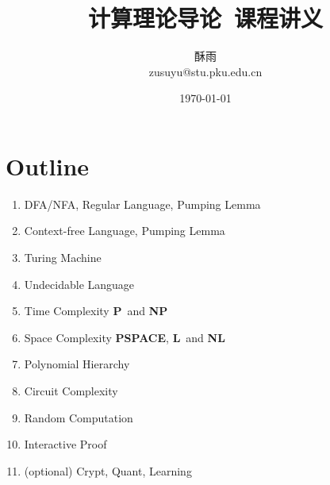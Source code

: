 \documentclass[8pt]{article}
\title{\heiti\zihao{1} 计算理论导论\ 课程讲义}
\author{\kaishu\zihao{-3} 酥雨\\zusuyu@stu.pku.edu.cn}
\date{\today}
\theoremstyle{compact}
\def\P{\textbf{P}}
\def\NP{\textbf{NP}}
\def\PSPACE{\textbf{PSPACE}}
\def\L{\textbf{L}}
\def\NL{\textbf{NL}}
\begin{document}
\pagestyle{plain}

\maketitle

\section*{Outline}
	\begin{enumerate}	
		\item DFA/NFA, Regular Language, Pumping Lemma
		\item Context-free Language, Pumping Lemma
		\item Turing Machine
		\item Undecidable Language
		\item Time Complexity \P\ and \NP
		\item Space Complexity \PSPACE, \L\ and \NL
		\item Polynomial Hierarchy
		\item Circuit Complexity
		\item Random Computation
		\item Interactive Proof
		\item (optional) Crypt, Quant, Learning
	\end{enumerate}



\newpage
\end{document}
